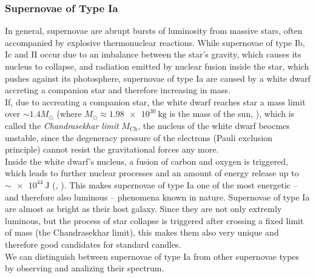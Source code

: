 \subsubsection{Supernovae of Type Ia}

In general, supernovae are abrupt bursts of luminosity from massive stars, often accompanied by explosive thermonuclear reactions.
While supernovae of type Ib, Ic and II occur due to an imbalance between the star's gravity, which causes its nucleus to collapse, and radiation emitted by nuclear fusion inside the star, which pushes against its photosphere, supernovae of type Ia are caused by a white dwarf accreting a companion star and therefore increasing in mass. \\
If, due to accreating a companion star, the white dwarf reaches star a mass limit over $\sim 1.4 M_{\odot}$ (where $M_{\odot} \approx \SI{1.98e+30}{\kilogram}$ is the mass of the sun, \cite[p.~48]{Bartelmann2019}), which is called the \textit{Chandrasekhar limit} $M_{\text{Ch}}$, the nucleus of the white dwarf beocmes unstable, since the degeneracy pressure of the electrons (Pauli exclusion principle) cannot resist the gravitational forces any more. \\
Inside the white dwarf's nucleus, a fusion of carbon and oxygen is triggered, which leads to further nuclear processes and an amount of energy release up to $\sim \SI{e+44}{\joule}$ (\cite[p.~295]{Maguire2017}, \cite[p.~321]{Spatschek2017}).
This makes supernovae of type Ia one of the most energetic -- and therefore also luminous -- phenomena known in nature. Supernovae of type Ia are almost as bright as their host galaxy. 
Since they are not only extremly luminous, but the process of star collapse is triggered after crossing a fixed limit of mass (the Chandrasekhar limit), this makes them also very unique and therefore good candidates for standard candles. \\
\noindent We can distinguish between supernovae of type Ia from other supernovae types by observing and analizing their spectrum.


